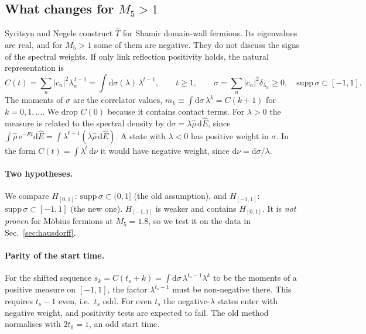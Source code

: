 \documentclass[11pt]{article}
\newcommand{\dd}{\mathrm{d}}
\newcommand{\ee}{\mathrm{e}}
\theoremstyle{remark}
\begin{document}
\subsection{What changes for $M_5>1$}
Syritsyn and Negele \cite{Syritsyn:2007} construct $\hat T$ for Shamir domain-wall fermions. Its eigenvalues are real, and for $M_5>1$ some of them are negative.
They do not discuss the signs of the spectral weights. If only link reflection positivity holds, the natural representation is
\begin{equation}
 C(t)=\sum_n|c_n|^2\lambda_n^{\,t-1}=\int\dd\sigma(\lambda)\,\lambda^{t-1},\qquad t\ge1,\qquad \sigma=\sum_n|c_n|^2\delta_{\lambda_n}\ge0,
 \quad \mathrm{supp}\,\sigma\subset[-1,1].
 \label{eq:model}
\end{equation}
The moments of $\sigma$ are the correlator values, $m_k\equiv\int\dd\sigma\,\lambda^k=C(k+1)$ for $k=0,1,\dots$. We drop $C(0)$ because it contains contact terms.
For $\lambda>0$ the measure is related to the spectral density by $\dd\sigma=\lambda\hat\rho\,\dd\hat E$, since
$\int\hat\rho\,\ee^{-\hat Et}\dd\hat E=\int\lambda^{t-1}(\lambda\hat\rho\,\dd\hat E)$. A state with $\lambda<0$ has positive weight in $\sigma$.
In the form $C(t)=\int\lambda^t\,\dd\nu$ it would have negative weight, since $\dd\nu=\dd\sigma/\lambda$.

\paragraph{Two hypotheses.} We compare
$H_{[0,1]}$: $\mathrm{supp}\,\sigma\subset(0,1]$ (the old assumption), and $H_{[-1,1]}$: $\mathrm{supp}\,\sigma\subset[-1,1]$ (the new one).
$H_{[-1,1]}$ is weaker and contains $H_{[0,1]}$. It is \emph{not proven} for M\"obius fermions at $M_5=1.8$, so we test it on the data in Sec.~\ref{sec:hausdorff}.

\paragraph{Parity of the start time.} For the shifted sequence $s_k=C(t_s+k)=\int\dd\sigma\,\lambda^{t_s-1}\lambda^k$ to be the moments of a positive measure
on $[-1,1]$, the factor $\lambda^{t_s-1}$ must be non-negative there. This requires $t_s-1$ even, i.e.\ $t_s$ odd. For even $t_s$ the negative-$\lambda$ states enter with negative weight,
and positivity tests are expected to fail. The old method normalises with $2t_0=1$, an odd start time.

\end{document}
